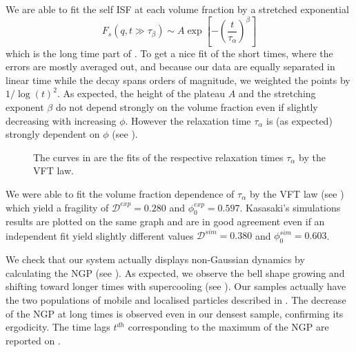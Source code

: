 We are able to fit the self \ac{ISF} at each volume fraction by a stretched exponential
\begin{equation}
	F_s(q,t\gg\tau_\beta) \sim A \exp{\left[ -\left( \frac{t}{\tau_\alpha} \right)^\beta\right] }
	\label{eq:streched_exp}
\end{equation}
which is the long time part of . To get a nice fit of the short times, where the errors are mostly averaged out, and because our data are equally separated in linear time while the decay spans orders of magnitude, we weighted the points by $1/\log(t)^2$. As expected, the height of the plateau $A$ and the stretching exponent $\beta$ do not depend strongly on the volume fraction even if slightly decreasing with increasing $\phi$. However the relaxation time $\tau_\alpha$ is (as expected) strongly dependent on $\phi$ (see ).

\begin{figure}
	\centering
	\caption{The curves in  are the fits of the respective relaxation times $\tau_\alpha$ by the \acs{VFT} law.}
	\label{fig:vtf_ngp}
\end{figure}

We were able to fit the volume fraction dependence of $\tau_\alpha$ by the \ac{VFT} law (see ) which yield a fragility of $\mathcal{D}^{exp} = 0.280$ and $\phi_0^{exp}=0.597$. Kasasaki's simulations results are plotted on the same graph and are in good agreement even if an independent fit yield slightly different values $\mathcal{D}^{sim} = 0.380$ and $\phi_0^{sim}=0.603$.

We check that our system actually displays non-Gaussian dynamics by calculating the \ac{NGP} (see ). As expected, we observe the bell shape growing and shifting toward longer times with supercooling (see ). Our samples actually have the two populations of mobile and localised particles described in . The decrease of the \ac{NGP} at long times is observed even in our densest sample, confirming its ergodicity. The time lags $t^{dh}$ corresponding to the maximum of the \ac{NGP} are reported on .

